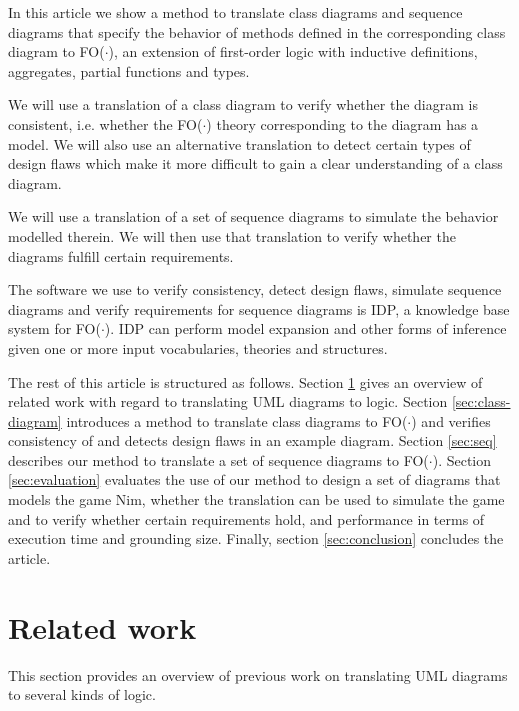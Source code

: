 \documentclass[conference]{IEEEtran}
\begin{document}
In this article we show a method to translate class diagrams and sequence diagrams that specify the behavior of methods defined in the corresponding class diagram to FO($\cdot$)\cite{DeCatBroes2014PLaa}, an extension of first-order logic with inductive definitions, aggregates, partial functions and types.

We will use a translation of a class diagram to verify whether the diagram is consistent, i.e. whether the FO($\cdot$) theory corresponding to the diagram has a model. We will also use an alternative translation to detect certain types of design flaws which make it more difficult to gain a clear understanding of a class diagram.

We will use a translation of a set of sequence diagrams to simulate the behavior modelled therein. We will then use that translation to verify whether the diagrams fulfill certain requirements.

The software we use to verify consistency, detect design flaws, simulate sequence diagrams and verify requirements for sequence diagrams is IDP\cite{DeCatBroes2014PLaa}, a knowledge base system for FO($\cdot$). IDP can perform model expansion and other forms of inference given one or more input vocabularies, theories and structures. 

The rest of this article is structured as follows. Section \ref{sec:related-work} gives an overview of related work with regard to translating UML diagrams to logic. Section \ref{sec:class-diagram} introduces a method to translate class diagrams to FO($\cdot$) and verifies consistency of and detects design flaws in an example diagram. Section \ref{sec:seq} describes our method to translate a set of sequence diagrams to FO($\cdot$). Section \ref{sec:evaluation} evaluates the use of our method to design a set of diagrams that models the game Nim, whether the translation can be used to simulate the game and to verify whether certain requirements hold, and performance in terms of execution time and grounding size. Finally, section \ref{sec:conclusion} concludes the article.

\section{Related work}\label{sec:related-work}

This section provides an overview of previous work on translating UML diagrams to several kinds of logic.
\end{document}
